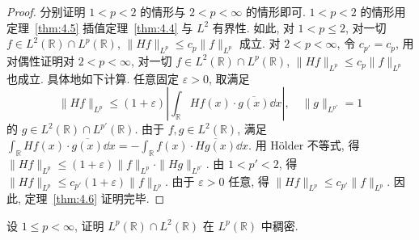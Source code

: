 \begin{proof}
分别证明 $1 < p < 2$ 的情形与 $2 < p < \infty$ 的情形即可. $1 < p < 2$ 的情形用定理~\ref{thm:4.5} 插值定理~\ref{thm:4.4} 与 $L^{2}$ 有界性. 如此, 对 $1 < p \leq 2$, 对一切 $f \in L^{2}(\mathbb{R}) \cap L^{p}(\mathbb{R})$, $\|Hf\|_{L^{p}} \leq c_{p}\|f\|_{L^{p}}$ 成立. 对 $2 < p < \infty$, 令 $c_{p'} = c_{p}$, 用对偶性证明对 $2 < p < \infty$, 对一切 $f \in L^{2}(\mathbb{R}) \cap L^{p}(\mathbb{R})$, $\|Hf\|_{L^{p}} \leq c_{p}\|f\|_{L^{p}}$ 也成立. 具体地如下计算. 任意固定 $\varepsilon > 0$, 取满足
\begin{equation}\tag{4.31}
\|Hf\|_{L^{p}} \leq (1+\varepsilon)\left|\int_{\mathbb{R}}Hf(x) \cdot \overline{g(x)}\dd x\right|, \quad \|g\|_{L^{p'}} = 1
\label{eq:4.31}
\end{equation}
的 $g \in L^{2}(\mathbb{R}) \cap L^{p'}(\mathbb{R})$. 由于 $f, g \in L^{2}(\mathbb{R})$, 满足 $\int_{\mathbb{R}}Hf(x) \cdot \overline{g(x)}\dd x = -\int_{\mathbb{R}}f(x) \cdot \overline{Hg(x)}\dd x$. 用 Hölder 不等式, 得 $\|Hf\|_{L^{p}} \leq (1+\varepsilon)\|f\|_{L^{p}} \cdot \|Hg\|_{L^{p'}}$. 由 $1 < p' < 2$, 得 $\|Hf\|_{L^{p}} \leq c_{p'}(1+\varepsilon)\|f\|_{L^{p}}$. 由于 $\varepsilon > 0$ 任意, 得 $\|Hf\|_{L^{p}} \leq c_{p'}\|f\|_{L^{p}}$. 因此, 定理~\ref{thm:4.6} 证明完毕.
\end{proof}

\begin{exercise}\label{exer:4.11}
设 $1 \leq p < \infty$, 证明 $L^{p}(\mathbb{R}) \cap L^{2}(\mathbb{R})$ 在 $L^{p}(\mathbb{R})$ 中稠密.
\end{exercise}
